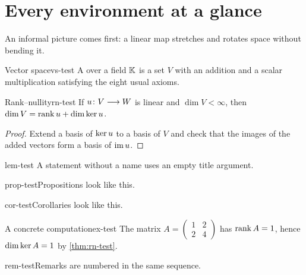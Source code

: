 \documentclass[print]{docmathdz}
\begin{document}
\dmzmakecover
\dmztitlepage
\tableofcontents
\mainmatter

\chapter{Every environment at a glance}

\begin{intuition}
An informal picture comes first: a linear map stretches and rotates space
without bending it.
\end{intuition}

\begin{definition}{Vector space}{vs-test}
A  over a field $\mathbb{K}$ is a set $V$ with an addition and a
scalar multiplication satisfying the eight usual axioms.
\end{definition}

\begin{theorem}{Rank--nullity}{rn-test}
If $u\colon V\longrightarrow W$ is linear and $\dim V<\infty$, then
$\dim V=\operatorname{rank} u+\dim\operatorname{ker} u$.
\end{theorem}

\begin{proof}
Extend a basis of $\operatorname{ker} u$ to a basis of $V$ and check that the images of the
added vectors form a basis of $\operatorname{im} u$.
\end{proof}

\begin{lemma}{}{lem-test}
A statement without a name uses an empty title argument.
\end{lemma}

\begin{proposition}{}{prop-test}Propositions look like this.\end{proposition}
\begin{corollary}{}{cor-test}Corollaries look like this.\end{corollary}

\begin{example}{A concrete computation}{ex-test}
The matrix $A=\begin{pmatrix}1&2\\2&4\end{pmatrix}$ has $\operatorname{rank} A=1$, hence
$\dim\operatorname{ker} A=1$ by \cref{thm:rn-test}.
\end{example}

\begin{remark}{}{rem-test}Remarks are numbered in the same sequence.\end{remark}
\end{document}
